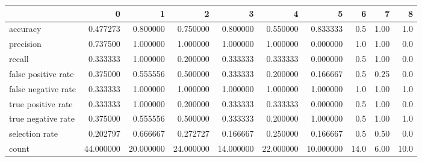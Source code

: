 \begin{tabular}{lrrrrrrrrr}
\toprule
{} &          0 &          1 &          2 &          3 &          4 &          5 &     6 &     7 &     8 \\
\midrule
accuracy            &   0.477273 &   0.800000 &   0.750000 &   0.800000 &   0.550000 &   0.833333 &   0.5 &  1.00 &   1.0 \\
precision           &   0.737500 &   1.000000 &   1.000000 &   1.000000 &   1.000000 &   0.000000 &   1.0 &  1.00 &   0.0 \\
recall              &   0.333333 &   1.000000 &   0.200000 &   0.333333 &   0.333333 &   0.000000 &   0.5 &  1.00 &   0.0 \\
false positive rate &   0.375000 &   0.555556 &   0.500000 &   0.333333 &   0.200000 &   0.166667 &   0.5 &  0.25 &   0.0 \\
false negative rate &   0.333333 &   1.000000 &   1.000000 &   1.000000 &   1.000000 &   1.000000 &   1.0 &  1.00 &   1.0 \\
true positive rate  &   0.333333 &   1.000000 &   0.200000 &   0.333333 &   0.333333 &   0.000000 &   0.5 &  1.00 &   0.0 \\
true negative rate  &   0.375000 &   0.555556 &   0.500000 &   0.333333 &   0.200000 &   1.000000 &   0.5 &  1.00 &   1.0 \\
selection rate      &   0.202797 &   0.666667 &   0.272727 &   0.166667 &   0.250000 &   0.166667 &   0.5 &  0.50 &   0.0 \\
count               &  44.000000 &  20.000000 &  24.000000 &  14.000000 &  22.000000 &  10.000000 &  14.0 &  6.00 &  10.0 \\
\bottomrule
\end{tabular}
